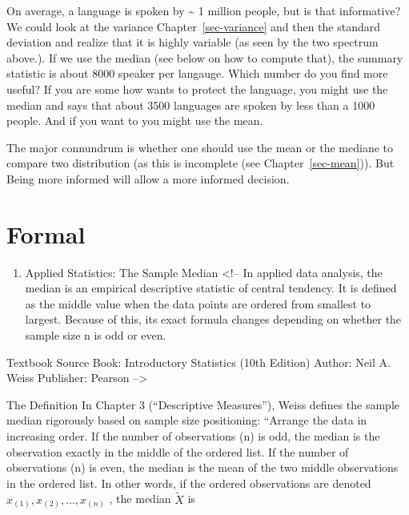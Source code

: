 \documentclass[
  letterpaper,
  DIV=11,
  numbers=noendperiod]{scrreprt}
\providecommand{\tightlist}{%
  \setlength{\itemsep}{0pt}\setlength{\parskip}{0pt}}
\begin{document}
On average, a language is spoken by \textasciitilde{} 1 million people,
but is that informative? We could look at the variance
Chapter~\ref{sec-variance} and then the standard deviation and realize
that it is highly variable (as seen by the two spectrum above.). If we
use the median (see below on how to compute that), the summary statistic
is about 8000 speaker per langauge. Which number do you find more
useful? If you are some how wants to protect the language, you might use
the median and says that about 3500 languages are spoken by less than a
1000 people. And if you want to you might use the mean.

The major connundrum is whether one should use the mean or the mediane
to compare two distribution (as this is incomplete (see
Chapter~\ref{sec-mean})). But Being more informed will allow a more
informed decision.

\section*{Formal}\label{formal-23}


\begin{enumerate}
\def\labelenumi{\arabic{enumi}.}
\tightlist
\item
  Applied Statistics: The Sample Median \textless!-- In applied data
  analysis, the median is an empirical descriptive statistic of central
  tendency. It is defined as the middle value when the data points are
  ordered from smallest to largest. Because of this, its exact formula
  changes depending on whether the sample size n is odd or even.
\end{enumerate}

Textbook Source Book: Introductory Statistics (10th Edition) Author:
Neil A. Weiss Publisher: Pearson --\textgreater{}

The Definition In Chapter 3 (``Descriptive Measures''), Weiss defines
the sample median rigorously based on sample size positioning: ``Arrange
the data in increasing order. If the number of observations (n) is odd,
the median is the observation exactly in the middle of the ordered list.
If the number of observations (n) is even, the median is the mean of the
two middle observations in the ordered list. In other words, if the
ordered observations are denoted \(x_{(1)},x_{(2)}, \ldots, x_{(n)}\)
\hspace{0pt} , the median \(\tilde{X}\) is
\end{document}
